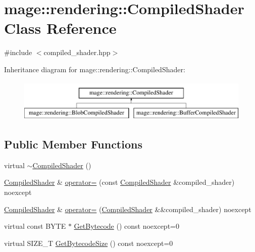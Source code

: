 \hypertarget{classmage_1_1rendering_1_1_compiled_shader}{}\section{mage\+:\+:rendering\+:\+:Compiled\+Shader Class Reference}
\label{classmage_1_1rendering_1_1_compiled_shader}


{\ttfamily \#include $<$compiled\+\_\+shader.\+hpp$>$}

Inheritance diagram for mage\+:\+:rendering\+:\+:Compiled\+Shader\+:\begin{figure}[H]
\begin{center}
\leavevmode
\includegraphics[height=2.000000cm]{classmage_1_1rendering_1_1_compiled_shader}
\end{center}
\end{figure}
\subsection*{Public Member Functions}
\begin{DoxyCompactItemize}
\item 
virtual \mbox{\hyperlink{classmage_1_1rendering_1_1_compiled_shader_abb17672237a99552beef603cd1d4f680}{$\sim$\+Compiled\+Shader}} ()
\item 
\mbox{\hyperlink{classmage_1_1rendering_1_1_compiled_shader}{Compiled\+Shader}} \& \mbox{\hyperlink{classmage_1_1rendering_1_1_compiled_shader_a1981d885693b7849078f509f15b81071}{operator=}} (const \mbox{\hyperlink{classmage_1_1rendering_1_1_compiled_shader}{Compiled\+Shader}} \&compiled\+\_\+shader) noexcept
\item 
\mbox{\hyperlink{classmage_1_1rendering_1_1_compiled_shader}{Compiled\+Shader}} \& \mbox{\hyperlink{classmage_1_1rendering_1_1_compiled_shader_ab4217b5b68c5cc33b6736a844ddfe699}{operator=}} (\mbox{\hyperlink{classmage_1_1rendering_1_1_compiled_shader}{Compiled\+Shader}} \&\&compiled\+\_\+shader) noexcept
\item 
virtual const B\+Y\+TE $\ast$ \mbox{\hyperlink{classmage_1_1rendering_1_1_compiled_shader_a6067250341f428be19ed2aa9955a10b6}{Get\+Bytecode}} () const noexcept=0
\item 
virtual S\+I\+Z\+E\+\_\+T \mbox{\hyperlink{classmage_1_1rendering_1_1_compiled_shader_a92c17b46242bf884c3d0d673e88a292d}{Get\+Bytecode\+Size}} () const noexcept=0
\end{DoxyCompactItemize}

